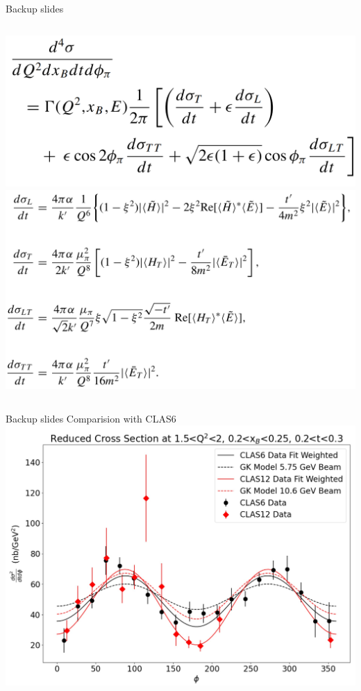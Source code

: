 \documentclass[aspectratio=169]{beamer}
\begin{document}
\begin{frame}{Backup slides}
\begin{columns}
            \includegraphics[scale=0.14]{Pics/currentWork/cross-section-formula.png}\\
            \includegraphics[scale=0.085]{Pics/currentWork/gpds.png}\\
            
    \end{columns}
    
\end{frame}

\begin{frame}{Backup slides}
\centering
Comparision with CLAS6\\

    \includegraphics[scale=0.2832]{DNP/comp_c12_gk_c6.jpg}\\
\end{frame}
\end{document}
